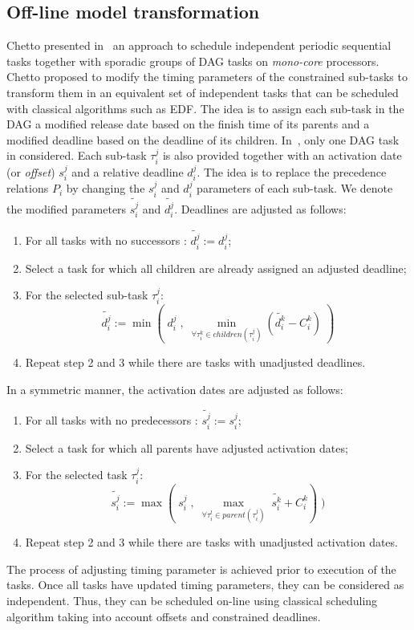 \documentclass[main.tex]{subfiles}
\begin{document}
\subsection{Off-line model transformation}
Chetto \etal presented in~\cite{Chetto1990} an approach to schedule independent
periodic sequential tasks together with sporadic groups of DAG tasks on
\emph{mono-core} processors. Chetto \etal proposed to modify the timing
parameters of the constrained sub-tasks to transform them in an equivalent set
of independent tasks that can be scheduled with classical algorithms such as
EDF. The idea is to assign each sub-task in the DAG a modified release date
based on the finish time of its parents and a modified deadline based on the
deadline of its children.  In~\cite{Chetto1990}, only one DAG task in
considered. Each sub-task $\tau_i^j$ is also provided together with an
activation date (or \emph{offset}) $s_i^j$ and a relative deadline $d_i^j$. The
idea is to replace the precedence relations $P_i$ by changing the $s_i^j$ and
$d_i^j$ parameters of each sub-task. We denote the modified parameters $
\widetilde{s_i^j}$ and $ \widetilde{d_i^j} $.  Deadlines are adjusted as
follows:
\begin{enumerate}
    \item For all tasks with no successors : $\widetilde{d_i^j} := d_i^j$;
    \item Select a task for which all children are already assigned an adjusted deadline;
    \item For the selected sub-task $\tau_i^j$: 
        \begin{displaymath}
            \widetilde{d_i^j} := \min ( \; d_i^j \; , \; \underset{\forall \tau_i^k \in children(\tau_i^j)}{\min} ( \widetilde{d_i^k} - C_i^k) \; )
        \end{displaymath}
    \item Repeat step 2 and 3 while there are tasks with unadjusted deadlines.
\end{enumerate}
In a symmetric manner, the activation dates are adjusted as follows:
\begin{enumerate}
    \item For all tasks with no predecessors : $ \widetilde{s_i^j} := s_i^j$;
    \item Select a task for which all parents have adjusted activation dates;
    \item For the selected task $\tau_i^j$:
        \begin{displaymath}
            \widetilde{s_i^j} := \max ( \; s_i^j \; , \; \underset{\forall \tau_i^l \in parent(\tau_i^j)}{\max} \; \widetilde{s_i^k} + C_i^k) \; )
        \end{displaymath}
    \item Repeat step 2 and 3 while there are tasks with unadjusted activation dates.
\end{enumerate}
The process of adjusting timing parameter is achieved prior to execution of the
tasks. Once all tasks have updated timing parameters, they can be considered as
independent. Thus, they can be scheduled on-line using classical scheduling
algorithm taking into account offsets and constrained deadlines. 
\end{document}

